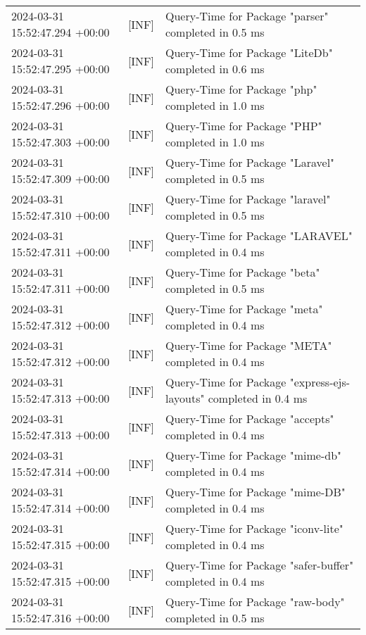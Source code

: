 {{\begin{tabularx}{\textwidth}{|l|l|X|}
                    2024-03-31 15:52:47.294 +00:00 & [INF] & Query-Time for Package "parser" completed in 0.5 ms \\
                    2024-03-31 15:52:47.295 +00:00 & [INF] & Query-Time for Package "LiteDb" completed in 0.6 ms \\
                    2024-03-31 15:52:47.296 +00:00 & [INF] & Query-Time for Package "php" completed in 1.0 ms \\
                    2024-03-31 15:52:47.303 +00:00 & [INF] & Query-Time for Package "PHP" completed in 1.0 ms \\
                    2024-03-31 15:52:47.309 +00:00 & [INF] & Query-Time for Package "Laravel" completed in 0.5 ms \\
                    2024-03-31 15:52:47.310 +00:00 & [INF] & Query-Time for Package "laravel" completed in 0.5 ms \\
                    2024-03-31 15:52:47.311 +00:00 & [INF] & Query-Time for Package "LARAVEL" completed in 0.4 ms \\
                    2024-03-31 15:52:47.311 +00:00 & [INF] & Query-Time for Package "beta" completed in 0.5 ms \\
                    2024-03-31 15:52:47.312 +00:00 & [INF] & Query-Time for Package "meta" completed in 0.4 ms \\
                    2024-03-31 15:52:47.312 +00:00 & [INF] & Query-Time for Package "META" completed in 0.4 ms \\
                    2024-03-31 15:52:47.313 +00:00 & [INF] & Query-Time for Package "express-ejs-layouts" completed in 0.4 ms \\
                    2024-03-31 15:52:47.313 +00:00 & [INF] & Query-Time for Package "accepts" completed in 0.4 ms \\
                    2024-03-31 15:52:47.314 +00:00 & [INF] & Query-Time for Package "mime-db" completed in 0.4 ms \\
                    2024-03-31 15:52:47.314 +00:00 & [INF] & Query-Time for Package "mime-DB" completed in 0.4 ms \\
                    2024-03-31 15:52:47.315 +00:00 & [INF] & Query-Time for Package "iconv-lite" completed in 0.4 ms \\
                    2024-03-31 15:52:47.315 +00:00 & [INF] & Query-Time for Package "safer-buffer" completed in 0.4 ms \\
                    2024-03-31 15:52:47.316 +00:00 & [INF] & Query-Time for Package "raw-body" completed in 0.5 ms \\

\end{tabularx}}}
